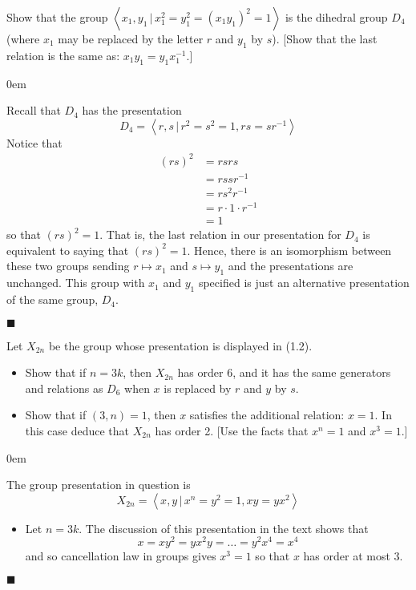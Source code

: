 \documentclass[12pt]{article}
\renewcommand{\qed}{\hfill$\blacksquare$}
\renewenvironment{proof}{\begin{addmargin}[1em]{0em}\begin{newproof}}{\end{newproof}\end{addmargin}\qed}
\newenvironment{problem}[2][Exercise]{\begin{trivlist}
\item[\hskip \labelsep {\bfseries #1}\hskip \labelsep {\bfseries #2.}]}{\end{trivlist}}
\begin{document}
\begin{problem}{1.2.16}
Show that the group $\left\langle x_1,y_1 \, | \, x_1^2=y_1^2=\left(x_1y_1\right)^2=1\right\rangle$ is the dihedral group $D_4$ (where $x_1$ may be replaced by the letter $r$ and $y_1$ by $s$). [Show that the last relation is the same as: $x_1y_1 = y_1x_1^{-1}$.]
\end{problem}
\begin{proof}
Recall that $D_4$ has the presentation
$$ D_4 = \left\langle r,s \, | \, r^2=s^2 = 1, rs = sr^{-1}\right\rangle $$ Notice that
\begin{equation*}
    \begin{split}
        \left(rs\right)^2 & = rsrs \\
        & = rs sr^{-1} \\
        & = rs^2 r^{-1} \\
        & = r\cdot 1 \cdot r^{-1} \\
        & = 1
    \end{split}
\end{equation*}
so that $\left(rs\right)^2 = 1$. That is, the last relation in our presentation for $D_4$ is equivalent to saying that $\left(rs\right)^2 = 1$. Hence, there is an isomorphism between these two groups sending $r\mapsto x_1$ and $s\mapsto y_1$ and the presentations are unchanged. This group with $x_1$ and $y_1$ specified is just an alternative presentation of the same group, $D_4$.
\end{proof}



\begin{problem}{1.2.17}
Let $X_{2n}$ be the group whose presentation is displayed in (1.2).
\begin{itemize}
    \item Show that if $n=3k$, then $X_{2n}$ has order 6, and it has the same generators and relations as $D_6$ when $x$ is replaced by $r$ and $y$ by $s$.
    \item Show that if $\left(3,n\right)=1$, then $x$ satisfies the additional relation: $x=1$. In this case deduce that $X_{2n}$ has order 2. [Use the facts that $x^n=1$ and $x^3=1$.]
\end{itemize}
\end{problem}

\begin{proof}
The group presentation in question is
$$ X_{2n} = \left\langle x,y \, | \, x^n = y^2 = 1, xy=yx^2 \right\rangle $$
\begin{itemize}
    \item Let $n=3k$. The discussion of this presentation in the text shows that
    $$ x = xy^2 = yx^2y = \ldots = y^2 x^4 = x^4 $$ and so cancellation law in groups gives $x^3 = 1$ so that $x$ has order at most $3$.
 \end{itemize}
\end{proof}
\end{document}

